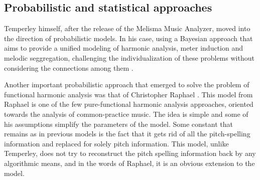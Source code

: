 


\subsection{Probabilistic and statistical approaches}
Temperley himself, after the release of the Melisma Music
Analyzer, moved into the direction of probabilistic models.
In his case, using a Bayesian approach that aims to provide
a unified modeling of harmonic analysis, meter induction and
melodic seggregation, challenging the individualization of
these problems without considering the connections among
them \cite{temperley2009unified}.

Another important probabilistic approach that emerged to
solve the problem of functional harmonic analysis was that
of Christopher Raphael \cite{raphael2003harmonic}. This
model from Raphael is one of the few pure-functional
harmonic analysis approaches, oriented towards the analysis
of common-practice music. The idea is simple and some of his
assumptions simplify the parameters of the model. Some
constant that remains as in previous models is the fact that
it gets rid of all the pitch-spelling information and
replaced for solely pitch information. This model, unlike
Temperley, does not try to reconstruct the pitch spelling
information back by any algorithmic means, and in the words
of Raphael, it is an obvious extension to the model.

